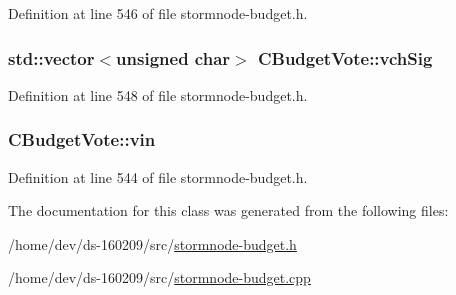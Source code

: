 Definition at line 546 of file stormnode-\/budget.\+h.

\hypertarget{class_c_budget_vote_abe31c3e9d62a7254550030f2b67643d7}{}
\subsubsection[{vch\+Sig}]{\setlength{\rightskip}{0pt plus 5cm}std\+::vector$<$unsigned char$>$ C\+Budget\+Vote\+::vch\+Sig}\label{class_c_budget_vote_abe31c3e9d62a7254550030f2b67643d7}


Definition at line 548 of file stormnode-\/budget.\+h.

\hypertarget{class_c_budget_vote_a335d3b479d57994097eccb52b50cbe53}{}
\subsubsection[{vin}]{ C\+Budget\+Vote\+::vin}\label{class_c_budget_vote_a335d3b479d57994097eccb52b50cbe53}


Definition at line 544 of file stormnode-\/budget.\+h.



The documentation for this class was generated from the following files\+:\begin{DoxyCompactItemize}
\item 
/home/dev/ds-\/160209/src/\hyperlink{stormnode-budget_8h}{stormnode-\/budget.\+h}\item 
/home/dev/ds-\/160209/src/\hyperlink{stormnode-budget_8cpp}{stormnode-\/budget.\+cpp}\end{DoxyCompactItemize}
